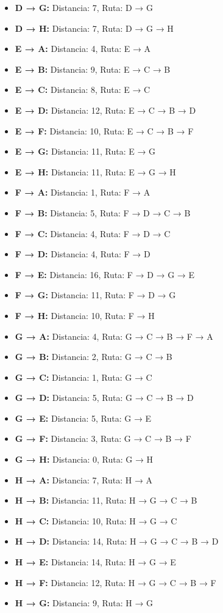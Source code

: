 \documentclass[12pt]{article}
\begin{document}
\begin{itemize}
\item \textbf{D → G:} Distancia: 7, Ruta: D → G
\item \textbf{D → H:} Distancia: 7, Ruta: D → G → H
\item \textbf{E → A:} Distancia: 4, Ruta: E → A
\item \textbf{E → B:} Distancia: 9, Ruta: E → C → B
\item \textbf{E → C:} Distancia: 8, Ruta: E → C
\item \textbf{E → D:} Distancia: 12, Ruta: E → C → B → D
\item \textbf{E → F:} Distancia: 10, Ruta: E → C → B → F
\item \textbf{E → G:} Distancia: 11, Ruta: E → G
\item \textbf{E → H:} Distancia: 11, Ruta: E → G → H
\item \textbf{F → A:} Distancia: 1, Ruta: F → A
\item \textbf{F → B:} Distancia: 5, Ruta: F → D → C → B
\item \textbf{F → C:} Distancia: 4, Ruta: F → D → C
\item \textbf{F → D:} Distancia: 4, Ruta: F → D
\item \textbf{F → E:} Distancia: 16, Ruta: F → D → G → E
\item \textbf{F → G:} Distancia: 11, Ruta: F → D → G
\item \textbf{F → H:} Distancia: 10, Ruta: F → H
\item \textbf{G → A:} Distancia: 4, Ruta: G → C → B → F → A
\item \textbf{G → B:} Distancia: 2, Ruta: G → C → B
\item \textbf{G → C:} Distancia: 1, Ruta: G → C
\item \textbf{G → D:} Distancia: 5, Ruta: G → C → B → D
\item \textbf{G → E:} Distancia: 5, Ruta: G → E
\item \textbf{G → F:} Distancia: 3, Ruta: G → C → B → F
\item \textbf{G → H:} Distancia: 0, Ruta: G → H
\item \textbf{H → A:} Distancia: 7, Ruta: H → A
\item \textbf{H → B:} Distancia: 11, Ruta: H → G → C → B
\item \textbf{H → C:} Distancia: 10, Ruta: H → G → C
\item \textbf{H → D:} Distancia: 14, Ruta: H → G → C → B → D
\item \textbf{H → E:} Distancia: 14, Ruta: H → G → E
\item \textbf{H → F:} Distancia: 12, Ruta: H → G → C → B → F
\item \textbf{H → G:} Distancia: 9, Ruta: H → G
\end{itemize}
\end{document}
